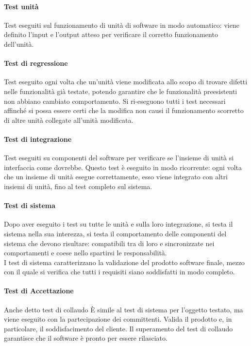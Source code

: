 				\paragraph{Test unità}
					Test eseguiti sul funzionamento di unità di software in modo automatico: viene definito l'input e l'output atteso per verificare il corretto funzionamento dell'unità.\\
				\paragraph{Test di regressione}
					Test eseguito ogni volta che un'unità viene modificata allo scopo di trovare difetti nelle funzionalità già testate, potendo garantire che le funzionalità preesistenti non abbiano cambiato comportamento. Si ri-eseguono tutti i test necessari affinché si possa essere certi che la modifica non causi il funzionamento scorretto di altre unità collegate all'unità modificata.\\
				\paragraph{Test di integrazione}
					Test eseguiti su componenti del software per verificare se l'insieme di unità si interfaccia come dovrebbe. Questo test è eseguito in modo ricorrente: ogni volta che un insieme di unità esegue correttamente, esso viene integrato con altri insiemi di unità, fino al test completo sul sistema.\\
				\paragraph{Test di sistema}
					Dopo aver eseguito i test su tutte le unità e sulla loro integrazione, si testa il sistema nella sua interezza, si testa il comportamento delle componenti del sistema che devono risultare: compatibili tra di loro e sincronizzate nei comportamenti e coese nello spartirsi le responsabilità.\\
					I test di sistema caratterizzano la validazione del prodotto software finale, mezzo con il quale si verifica che tutti i requisiti siano soddisfatti in modo completo.\\
				\paragraph{Test di Accettazione}
					Anche detto test di collaudo È simile al test di sistema per l’oggetto testato, ma viene eseguito con la partecipazione dei committenti. Valida il prodotto e, in particolare, il soddisfacimento del cliente. Il superamento del test di collaudo garantisce che il software è pronto per essere rilasciato.
